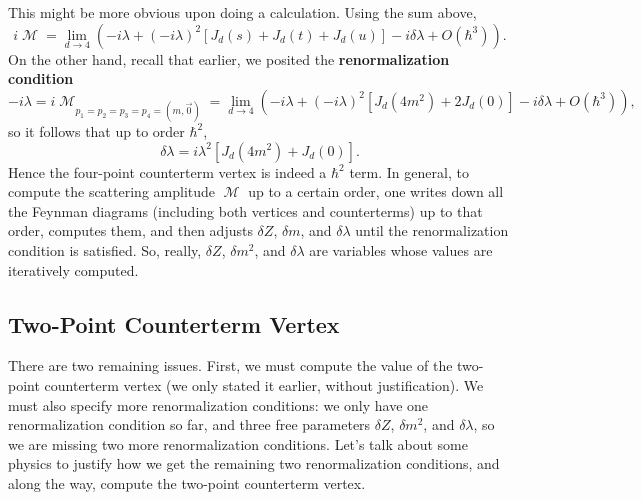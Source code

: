 \documentclass{report}
\theoremstyle{plain}
\theoremstyle{definition}
\theoremstyle{remark}
\DeclareMathOperator{\cM}{\mathcal{M}}
\begin{document}
This might be more obvious upon doing a calculation. Using the sum
above,
$$ i\cM = \lim_{d \to 4} (-i\lambda + (-i\lambda)^2[J_d(s) + J_d(t) + J_d(u)] - i\delta\lambda + O(\hbar^3)). $$
On the other hand, recall that earlier, we posited the {\bf
  renormalization condition}
$$ -i\lambda = i\cM_{p_1=p_2=p_3=p_4=(m,\vec{0})} = \lim_{d \to 4} (-i\lambda + (-i\lambda)^2[J_d(4m^2) + 2J_d(0)] - i\delta\lambda + O(\hbar^3)), $$
so it follows that up to order $\hbar^2$,
$$ \delta\lambda = i\lambda^2[J_d(4m^2) + J_d(0)]. $$
Hence the four-point counterterm vertex is indeed a $\hbar^2$ term. In
general, to compute the scattering amplitude $\cM$ up to a certain
order, one writes down all the Feynman diagrams (including both
vertices and counterterms) up to that order, computes them, and then
adjusts $\delta Z$, $\delta m$, and $\delta\lambda$ until the
renormalization condition is satisfied. So, really, $\delta Z$,
$\delta m^2$, and $\delta\lambda$ are variables whose values are
iteratively computed.

\subsection{Two-Point Counterterm Vertex}

There are two remaining issues. First, we must compute the value of
the two-point counterterm vertex (we only stated it earlier, without
justification). We must also specify more renormalization conditions:
we only have one renormalization condition so far, and three free
parameters $\delta Z$, $\delta m^2$, and $\delta \lambda$, so we are
missing two more renormalization conditions. Let's talk about some
physics to justify how we get the remaining two renormalization
conditions, and along the way, compute the two-point counterterm
vertex.
\end{document}
